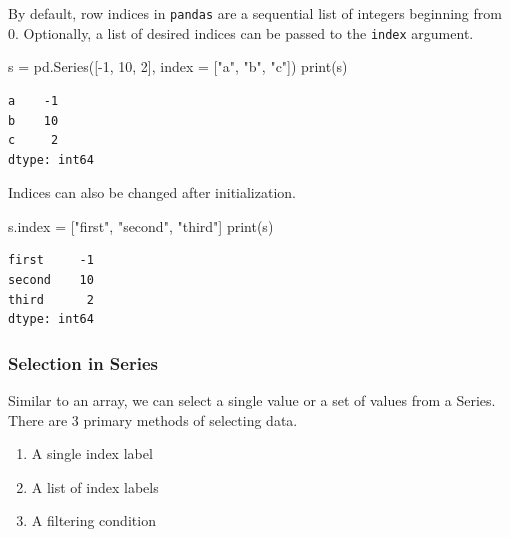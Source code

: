 \documentclass[
  letterpaper,
  DIV=11,
  numbers=noendperiod]{scrreprt}
\newenvironment{Shaded}{\begin{snugshade}}{\end{snugshade}}
\newcommand{\BuiltInTok}[1]{\textcolor[rgb]{0.00,0.23,0.31}{#1}}
\newcommand{\DecValTok}[1]{\textcolor[rgb]{0.68,0.00,0.00}{#1}}
\newcommand{\NormalTok}[1]{\textcolor[rgb]{0.00,0.23,0.31}{#1}}
\newcommand{\OperatorTok}[1]{\textcolor[rgb]{0.37,0.37,0.37}{#1}}
\newcommand{\StringTok}[1]{\textcolor[rgb]{0.13,0.47,0.30}{#1}}
\providecommand{\tightlist}{%
  \setlength{\itemsep}{0pt}\setlength{\parskip}{0pt}}\usepackage{longtable,booktabs,array}
\begin{document}
By default, row indices in \texttt{pandas} are a sequential list of
integers beginning from 0. Optionally, a list of desired indices can be
passed to the \texttt{index} argument.

\begin{Shaded}
\begin{Highlighting}[]
\NormalTok{s }\OperatorTok{=}\NormalTok{ pd.Series([}\OperatorTok{{-}}\DecValTok{1}\NormalTok{, }\DecValTok{10}\NormalTok{, }\DecValTok{2}\NormalTok{], index }\OperatorTok{=}\NormalTok{ [}\StringTok{"a"}\NormalTok{, }\StringTok{"b"}\NormalTok{, }\StringTok{"c"}\NormalTok{])}
\BuiltInTok{print}\NormalTok{(s)}
\end{Highlighting}
\end{Shaded}

\begin{verbatim}
a    -1
b    10
c     2
dtype: int64
\end{verbatim}

Indices can also be changed after initialization.

\begin{Shaded}
\begin{Highlighting}[]
\NormalTok{s.index }\OperatorTok{=}\NormalTok{ [}\StringTok{"first"}\NormalTok{, }\StringTok{"second"}\NormalTok{, }\StringTok{"third"}\NormalTok{]}
\BuiltInTok{print}\NormalTok{(s)}
\end{Highlighting}
\end{Shaded}

\begin{verbatim}
first     -1
second    10
third      2
dtype: int64
\end{verbatim}

\hypertarget{selection-in-series}{%
\subsubsection{Selection in Series}\label{selection-in-series}}

Similar to an array, we can select a single value or a set of values
from a Series. There are 3 primary methods of selecting data.

\begin{enumerate}
\def\labelenumi{\arabic{enumi}.}
\tightlist
\item
  A single index label
\item
  A list of index labels
\item
  A filtering condition
\end{enumerate}
\end{document}
